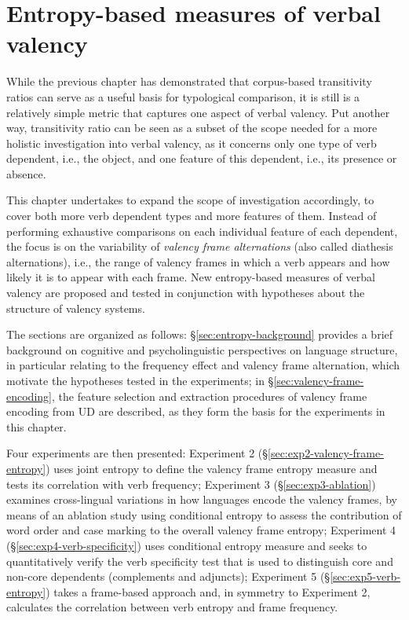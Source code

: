 \chapter{Entropy-based measures of verbal valency}\label{chapter:entropy}

While the previous chapter has demonstrated that corpus-based transitivity ratios can serve as a useful basis for typological comparison, it is still is a relatively simple metric that captures one aspect of verbal valency. Put another way, transitivity ratio can be seen as a subset of the scope needed for a more holistic investigation into verbal valency, as it concerns only one type of verb dependent, i.e., the object, and one feature of this dependent, i.e., its presence or absence. 

This chapter undertakes to expand the scope of investigation accordingly, to cover both more verb dependent types and more features of them. Instead of performing exhaustive comparisons on each individual feature of each dependent, the focus is on the variability of \textit{valency frame alternations} (also called diathesis alternations), i.e., the range of valency frames in which a verb appears and how likely it is to appear with each frame. New entropy-based measures of verbal valency are proposed and tested in conjunction with hypotheses about the structure of valency systems.

The sections are organized as follows: §\ref{sec:entropy-background} provides a brief background on cognitive and psycholinguistic perspectives on language structure, in particular relating to the frequency effect and valency frame alternation, which motivate the hypotheses tested in the experiments; in §\ref{sec:valency-frame-encoding}, the feature selection and extraction procedures of valency frame encoding from UD are described, as they form the basis for the experiments in this chapter. 

Four experiments are then presented: Experiment 2 (§\ref{sec:exp2-valency-frame-entropy}) uses joint entropy to define the valency frame entropy measure and tests its correlation with verb frequency; Experiment 3 (§\ref{sec:exp3-ablation}) examines cross-lingual variations in how languages encode the valency frames, by means of an ablation study using conditional entropy to assess the contribution of word order and case marking to the overall valency frame entropy; Experiment 4 (§\ref{sec:exp4-verb-specificity}) uses conditional entropy measure and seeks to quantitatively verify the verb specificity test that is used to distinguish core and non-core dependents (complements and adjuncts); Experiment 5 (§\ref{sec:exp5-verb-entropy}) takes a frame-based approach and, in symmetry to Experiment 2, calculates the correlation between verb entropy and frame frequency.

